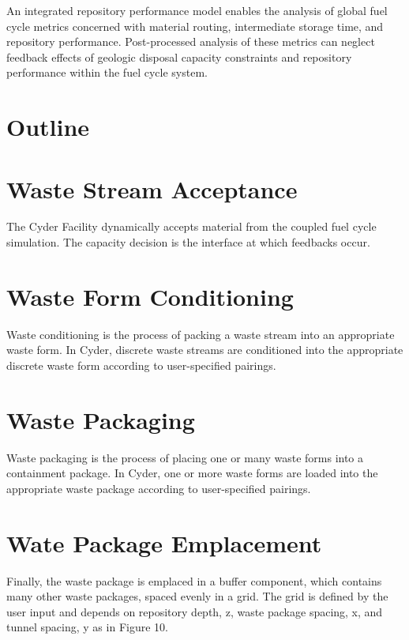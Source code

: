 \documentclass[letterpaper]{article}
\begin{document}
An integrated repository performance model enables the analysis of global fuel
cycle metrics concerned with material routing, intermediate storage time, and
repository performance. Post-processed analysis of these metrics can neglect
feedback effects of geologic disposal capacity constraints and repository
performance within the fuel cycle system.


\section*{Outline}


\section*{Waste Stream Acceptance}
The Cyder Facility dynamically accepts material from the coupled fuel
cycle simulation. The capacity decision is the interface at which feedbacks 
occur.

\section*{Waste Form Conditioning}

Waste conditioning is the process of packing a waste stream into an appropriate 
waste form.
In Cyder, discrete waste streams are conditioned into the appropriate
discrete waste form according to user-specified pairings.

\section*{Waste Packaging}
Waste packaging is the process of placing one or many waste forms into a 
containment package.
In Cyder, one or more waste forms are loaded into the appropriate waste
package according to user-specified pairings. 


\section*{Wate Package Emplacement}

Finally, the waste package is emplaced in a buffer component, which contains 
many other waste packages, spaced evenly in a grid. The grid is defined by the 
user input and depends on repository depth, z, waste package spacing, x, and 
tunnel spacing, y as in Figure 10.
\end{document}
